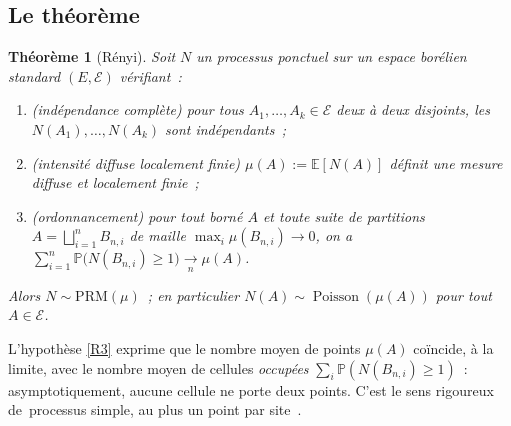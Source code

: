 \documentclass[11pt,a4paper]{article}
\providecommand{\og}{\guillemotleft\,}\providecommand{\fg}{\,\guillemotright}
\theoremstyle{plain}
\newtheorem{theoreme}{Théorème}[section]
\theoremstyle{definition}
\newcommand{\E}{\mathbb{E}}
\newcommand{\PP}{\mathbb{P}}
\newcommand{\Poi}{\operatorname{Poisson}}
\newcommand{\calE}{\mathcal{E}}
\begin{document}
\subsection{Le théorème}

\begin{theoreme}[Rényi]\label{thm:renyi}
Soit $N$ un processus ponctuel sur un espace borélien standard $(E,\calE)$ vérifiant~:
\begin{enumerate}[label=\textup{(R\arabic*)}]
\item\label{R1} \emph{(indépendance complète)} pour tous $A_1,\dots,A_k\in\calE$ deux à deux disjoints, les $N(A_1),\dots,N(A_k)$ sont indépendants~;
\item\label{R2} \emph{(intensité diffuse localement finie)} $\mu(A):=\E[N(A)]$ définit une mesure diffuse et localement finie~;
\item\label{R3} \emph{(ordonnancement)} pour tout borné $A$ et toute suite de partitions $A=\bigsqcup_{i=1}^{n}B_{n,i}$ de maille $\max_i\mu(B_{n,i})\to0$, on a $\displaystyle\sum_{i=1}^{n}\PP\big(N(B_{n,i})\ge1\big)\xrightarrow[n]{}\mu(A)$.
\end{enumerate}
Alors $N\sim\mathrm{PRM}(\mu)$~; en particulier $N(A)\sim\Poi(\mu(A))$ pour tout $A\in\calE$.
\end{theoreme}

L'hypothèse \ref{R3} exprime que le nombre moyen de points $\mu(A)$ coïncide, à la limite, avec le nombre moyen de cellules \emph{occupées} $\sum_i\PP(N(B_{n,i})\ge1)$~: asymptotiquement, aucune cellule ne porte deux points. C'est le sens rigoureux de \og processus simple, au plus un point par site \fg{}.
\end{document}
